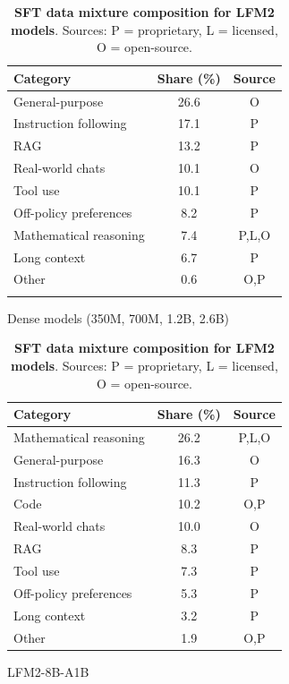 \documentclass{article}
\begin{document}
\begin{table}[h]
\centering
\begin{subfigure}[t]{0.48\textwidth}
\centering
\vspace{0pt}
\begin{tabular}{lcc}
\toprule
\textbf{Category} & \textbf{Share (\%)} & \textbf{Source} \\
\midrule
General-purpose        & 26.6 & O \\
Instruction following  & 17.1 & P \\
RAG                    & 13.2 & P \\
Real-world chats       & 10.1 & O \\
Tool use               & 10.1 & P \\
Off-policy preferences &  8.2 & P \\
Mathematical reasoning &  7.4 & P,L,O \\
Long context           &  6.7 & P \\
Other                  &  0.6 & O,P \\
                    &      &    \\
\bottomrule
\end{tabular}
\caption{Dense models (350M, 700M, 1.2B, 2.6B)}
\label{subfig:sft_densemixture}
\end{subfigure}
\hfill
\begin{subfigure}[t]{0.48\textwidth}
\centering
\vspace{0pt}
\begin{tabular}{lcc}
\toprule
\textbf{Category} & \textbf{Share (\%)} & \textbf{Source} \\
\midrule
Mathematical reasoning & 26.2 & P,L,O \\
General-purpose        & 16.3 & O \\
Instruction following  & 11.3 & P \\
Code                   & 10.2 & O,P \\
Real-world chats       & 10.0 & O \\
RAG                    &  8.3 & P \\
Tool use               &  7.3 & P \\
Off-policy preferences &  5.3 & P \\
Long context           &  3.2 & P \\
Other                  &  1.9 & O,P \\
\bottomrule
\end{tabular}
\caption{LFM2-8B-A1B}
\label{subfig:sft_moemixture}
\end{subfigure}
\caption{\textbf{SFT data mixture composition for LFM2 models}. Sources: P = proprietary, L = licensed, O = open-source.}
\label{fig:sft_mixtures}
\end{table}
\end{document}

